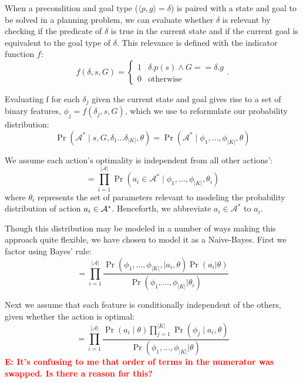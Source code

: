 \documentclass[conference]{IEEEtran}
\newcommand{\enote}[1]{\textcolor{Red}{\textbf{E: #1}}}
\begin{document}
When a precondition and goal type ($\langle p , g \rangle = \delta$) is paired with a
state and goal to be solved in a planning problem, we can evaluate whether $\delta$ is relevant by checking if the predicate of $\delta$ is true in the current state
and if the current goal is equivalent to the goal type of $\delta$. This relevance is defined with the indicator function $f$:
\begin{equation}
f(\delta, s, G) = 
\begin{cases}
1& \delta.p(s) \wedge G == \delta.g \\
0& \text{otherwise}
\end{cases}.
\label{eq:f_func_def}
\end{equation}

Evaluating f for each $\delta_j$ given the current state and goal gives rise to a set of binary features,
$\phi_j = f(\delta_j, s, G)$, which we use to reformulate our probability distribution:
\begin{equation}
\Pr(\mathcal{A}^* \mid s, G, \delta_1 \ldots \delta_{|K|}, \theta) = \Pr(\mathcal{A}^* \mid \phi_1, \ldots, \phi_{|K|}, \theta)
\label{eq:feature_rep}
\end{equation}

We assume each action's optimality is independent from all other actions':
\begin{equation}
= \prod_{i=1}^{|\mathcal{A}|} \Pr(a_i \in \mathcal{A}^* \mid \phi_1, \ldots, \phi_{|K|}, \theta_i)
\label{eq:action_independ}
\end{equation}
where $\theta_i$ represents the set of parameters relevant to modeling the probability
distribution of action $a_i \in {\cal A}^*$. Henceforth, we abbreviate $a_i \in \mathcal{A}^*$ to $a_i$.

Though this distribution may be modeled in a number of ways making this approach quite flexible, we have chosen to model it as a Naive-Bayes. 
First we factor using Bayes' rule:
\begin{equation}
= \prod_{i=1}^{|\mathcal{A}|} \frac{\Pr(\phi_1, \ldots, \phi_{|K|}, \mid a_i, \theta) \Pr(a_i | \theta)}{\Pr(\phi_1, \ldots, \phi_{|K|} | \theta_i)}
\label{eq:bayes}
\end{equation}

Next we assume that each feature is conditionally independent of the others, given whether the action is optimal:
\begin{equation}
= \prod_{i=1}^{|\mathcal{A}|} \frac{\Pr(a_i \mid \theta) \prod_{j=1}^{|K|} \Pr(\phi_j \mid a_i, \theta) }{\Pr(\phi_1, \ldots, \phi_{|K|} | \theta)}
\label{eq:final}
\end{equation}
\enote{It's confusing to me that order of terms in the numerator was swapped. Is there a reason for this?}
\end{document}
